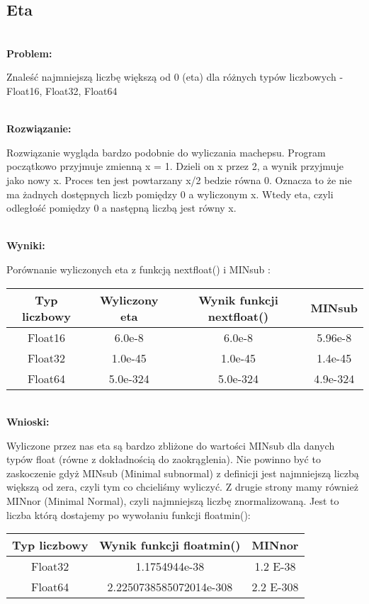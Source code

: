 \documentclass[a4paper,12pt]{article}
\begin{document}
\subsection{Eta}

\textbf{\\Problem:}

Znaleść najmniejszą liczbę większą od 0 (eta) dla różnych typów liczbowych - Float16, Float32, Float64

\textbf{\\Rozwiązanie:}

Rozwiązanie wygląda bardzo podobnie do wyliczania machepsu.
Program początkowo przyjmuje zmienną x = 1. Dzieli on x przez 2, a wynik
przyjmuje jako nowy x. Proces ten jest powtarzany x/2 bedzie równa 0.
Oznacza to że nie ma żadnych dostępnych liczb pomiędzy 0 a wyliczonym x.
Wtedy eta, czyli odległość pomiędzy 0 a następną liczbą jest równy x.

\textbf{\\Wyniki:}

Porównanie wyliczonych eta z funkcją nextfloat() i MINsub :

\begin{center}
\begin{tabular}{ |c|c|c|c| }
\hline
Typ liczbowy & Wyliczony eta & Wynik funkcji nextfloat() & MINsub \\
\hline
Float16 & \small{6.0e-8} & \small{6.0e-8} & \small{5.96e-8} \\
Float32 & \small{1.0e-45} & \small{1.0e-45} & \small{1.4e-45} \\
Float64 & \small{5.0e-324} & \small{5.0e-324} & \small{4.9e-324 } \\
\hline
\end{tabular}
\end{center}

\textbf{\\Wnioski:}

Wyliczone przez nas eta są bardzo zbliżone do wartości MINsub dla danych typów float (równe z dokładnością do zaokrąglenia).
Nie powinno być to zaskoczenie gdyż MINsub (Minimal subnormal) z definicji jest najmniejszą liczbą większą od zera, czyli tym co chcieliśmy wyliczyć.
Z drugie strony mamy również MINnor (Minimal Normal), czyli najmniejszą liczbę znormalizowaną. Jest to liczba którą dostajemy po wywołaniu
funkcji floatmin():

\begin{center}
\begin{tabular}{ |c|c|c| }
\hline
Typ liczbowy & Wynik funkcji floatmin() & MINnor \\
\hline
Float32 & \small{1.1754944e-38} & \small{1.2 E-38} \\
Float64 & \small{2.2250738585072014e-308} & \small{2.2 E-308} \\
\hline
\end{tabular}
\end{center}
\end{document}
